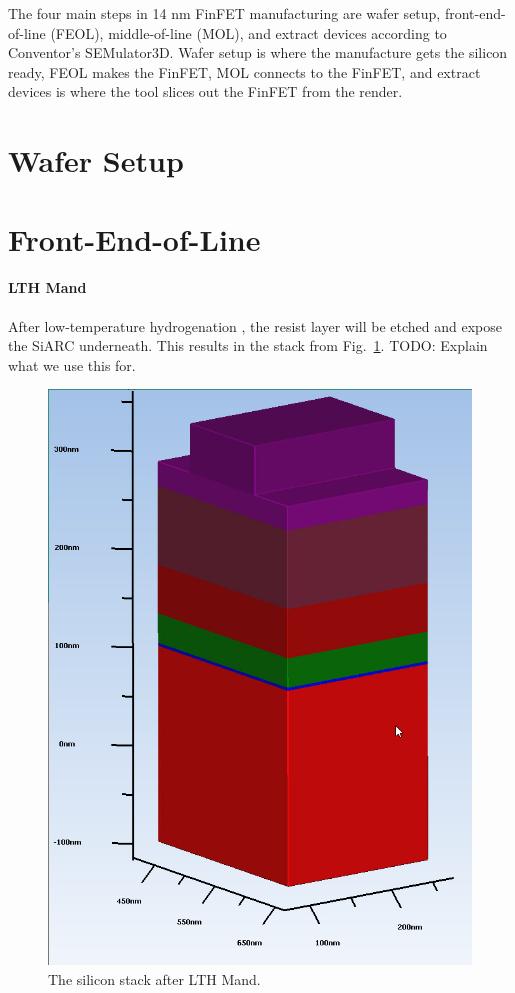 \documentclass[conference]{IEEEtran}
\begin{document}
The four main steps in 14 nm FinFET manufacturing are wafer setup,
front-end-of-line (FEOL), middle-of-line (MOL), and extract devices according to
Conventor's SEMulator3D. Wafer setup is where the manufacture gets the silicon
ready, FEOL makes the FinFET,  MOL connects to the FinFET, and extract devices
is where the tool slices out the FinFET from the render.

\section{Wafer Setup}

\section{Front-End-of-Line}

\paragraph{LTH Mand} After low-temperature hydrogenation \cite{knekr}, the resist layer will
be etched and expose the SiARC underneath. This results in the stack from
Fig.~\ref{lth_mand}.
TODO: Explain what we use this for.

\begin{figure}[htbp]
\centerline{\includegraphics[width=\linewidth]{pics/lth_mand.png}}
\caption{The silicon stack after LTH Mand.}
\label{lth_mand}
\end{figure}
\end{document}
